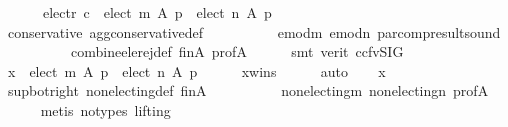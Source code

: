 \begin{isabellebody}
\ \ \ \ \ \ {\isacharparenleft}{\kern0pt}elect{\isacharunderscore}{\kern0pt}r\ c\ {\isasymsubseteq}\ {\isacharparenleft}{\kern0pt}{\isacharparenleft}{\kern0pt}elect\ m\ A\ p{\isacharparenright}{\kern0pt}\ {\isasymunion}\ {\isacharparenleft}{\kern0pt}elect\ n\ A\ p{\isacharparenright}{\kern0pt}{\isacharparenright}{\kern0pt}{\isacharparenright}{\kern0pt}{\isachardoublequoteclose}\isanewline
\ \ \ \ \isamarkupfalse%
\ conservative\ agg{\isacharunderscore}{\kern0pt}conservative{\isacharunderscore}{\kern0pt}def\isanewline
\ \ \ \ \ \ \ \ \ \ emod{\isacharunderscore}{\kern0pt}m\ emod{\isacharunderscore}{\kern0pt}n\ par{\isacharunderscore}{\kern0pt}comp{\isacharunderscore}{\kern0pt}result{\isacharunderscore}{\kern0pt}sound\isanewline
\ \ \ \ \ \ \ \ \ \ combine{\isacharunderscore}{\kern0pt}ele{\isacharunderscore}{\kern0pt}rej{\isacharunderscore}{\kern0pt}def\ fin{\isacharunderscore}{\kern0pt}A\ prof{\isacharunderscore}{\kern0pt}A\isanewline
\ \ \ \ \isamarkupfalse%
\ {\isacharparenleft}{\kern0pt}smt\ {\isacharparenleft}{\kern0pt}verit{\isacharcomma}{\kern0pt}\ ccfv{\isacharunderscore}{\kern0pt}SIG{\isacharparenright}{\kern0pt}{\isacharparenright}{\kern0pt}\isanewline
\ \ \isamarkupfalse%
\ {\isachardoublequoteopen}x\ {\isasymin}\ {\isacharparenleft}{\kern0pt}{\isacharparenleft}{\kern0pt}elect\ m\ A\ p{\isacharparenright}{\kern0pt}\ {\isasymunion}\ {\isacharparenleft}{\kern0pt}elect\ n\ A\ p{\isacharparenright}{\kern0pt}{\isacharparenright}{\kern0pt}{\isachardoublequoteclose}\isanewline
\ \ \ \ \isamarkupfalse%
\ x{\isacharunderscore}{\kern0pt}wins\isanewline
\ \ \ \ \isamarkupfalse%
\ auto\isanewline
\ \ \isamarkupfalse%
\ {\isachardoublequoteopen}x\ {\isasymin}\ {\isacharbraceleft}{\kern0pt}{\isacharbraceright}{\kern0pt}{\isachardoublequoteclose}\isanewline
\ \ \ \ \isamarkupfalse%
\ sup{\isacharunderscore}{\kern0pt}bot{\isacharunderscore}{\kern0pt}right\ non{\isacharunderscore}{\kern0pt}electing{\isacharunderscore}{\kern0pt}def\ fin{\isacharunderscore}{\kern0pt}A\isanewline
\ \ \ \ \ \ \ \ \ \ non{\isacharunderscore}{\kern0pt}electing{\isacharunderscore}{\kern0pt}m\ non{\isacharunderscore}{\kern0pt}electing{\isacharunderscore}{\kern0pt}n\ prof{\isacharunderscore}{\kern0pt}A\isanewline
\ \ \ \ \isamarkupfalse%
\ {\isacharparenleft}{\kern0pt}metis\ {\isacharparenleft}{\kern0pt}no{\isacharunderscore}{\kern0pt}types{\isacharcomma}{\kern0pt}\ lifting{\isacharparenright}{\kern0pt}{\isacharparenright}{\kern0pt}\isanewline
{}\isamarkupfalse%

\end{isabellebody}
